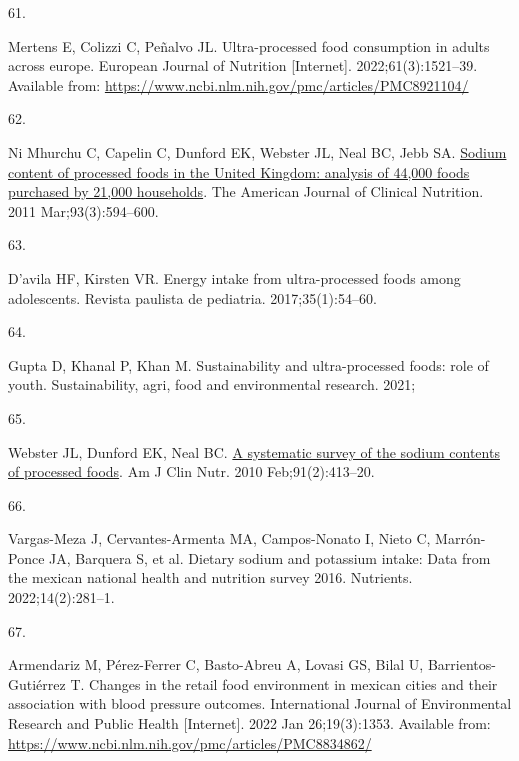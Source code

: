 \documentclass[
]{article}
\newlength{\cslhangindent}
\newlength{\csllabelwidth}
\newlength{\cslentryspacingunit} %
\newenvironment{CSLReferences}[2] %
 {%
  \setlength{\parindent}{0pt}
  \ifodd #1
  \let\oldpar\par
  \def\par{\hangindent=\cslhangindent\oldpar}
  \fi
  \setlength{\parskip}{#2\cslentryspacingunit}
 }%
 {}
\newcommand{\CSLLeftMargin}[1]{\parbox[t]{\csllabelwidth}{#1}}
\newcommand{\CSLRightInline}[1]{\parbox[t]{\linewidth - \csllabelwidth}{#1}\break}
\begin{document}
\begin{CSLReferences}{0}{0}
\leavevmode{}%
\CSLLeftMargin{61. }%
\CSLRightInline{Mertens E, Colizzi C, Peñalvo JL. Ultra-processed food
consumption in adults across europe. European Journal of Nutrition
{[}Internet{]}. 2022;61(3):1521--39. Available from:
\url{https://www.ncbi.nlm.nih.gov/pmc/articles/PMC8921104/}}

\leavevmode{}%
\CSLLeftMargin{62. }%
\CSLRightInline{Ni Mhurchu C, Capelin C, Dunford EK, Webster JL, Neal
BC, Jebb SA. \href{https://doi.org/10.3945/ajcn.110.004481}{Sodium
content of processed foods in the United Kingdom: analysis of 44,000
foods purchased by 21,000 households}. The American Journal of Clinical
Nutrition. 2011 Mar;93(3):594--600. }

\leavevmode{}%
\CSLLeftMargin{63. }%
\CSLRightInline{D'avila HF, Kirsten VR. Energy intake from
ultra-processed foods among adolescents. Revista paulista de pediatria.
2017;35(1):54--60. }

\leavevmode{}%
\CSLLeftMargin{64. }%
\CSLRightInline{Gupta D, Khanal P, Khan M. Sustainability and
ultra-processed foods: role of youth. Sustainability, agri, food and
environmental research. 2021; }

\leavevmode{}%
\CSLLeftMargin{65. }%
\CSLRightInline{Webster JL, Dunford EK, Neal BC.
\href{https://doi.org/10.3945/ajcn.2009.28688}{A systematic survey of
the sodium contents of processed foods}. Am J Clin Nutr. 2010
Feb;91(2):413--20. }

\leavevmode{}%
\CSLLeftMargin{66. }%
\CSLRightInline{Vargas-Meza J, Cervantes-Armenta MA, Campos-Nonato I,
Nieto C, Marrón-Ponce JA, Barquera S, et al. Dietary sodium and
potassium intake: {Data} from the mexican national health and nutrition
survey 2016. Nutrients. 2022;14(2):281--1. }

\leavevmode{}%
\CSLLeftMargin{67. }%
\CSLRightInline{Armendariz M, Pérez-Ferrer C, Basto-Abreu A, Lovasi GS,
Bilal U, Barrientos-Gutiérrez T. Changes in the retail food environment
in mexican cities and their association with blood pressure outcomes.
International Journal of Environmental Research and Public Health
{[}Internet{]}. 2022 Jan 26;19(3):1353. Available from:
\url{https://www.ncbi.nlm.nih.gov/pmc/articles/PMC8834862/}}


\end{CSLReferences}
\end{document}
